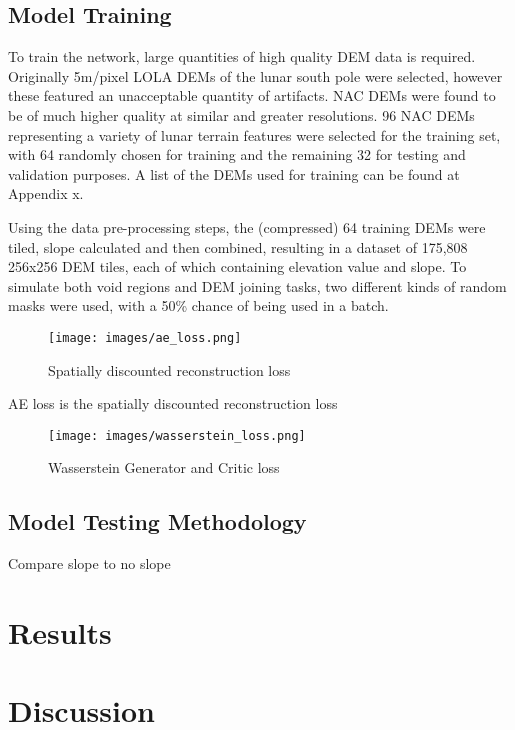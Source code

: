 \documentclass[twocolumn]{article}
\begin{document}
\subsection{Model Training}
\label{sec:org244e067}

To train the network, large quantities of high quality DEM data is required.
Originally 5m/pixel LOLA DEMs of the lunar south pole were selected, however these featured an unacceptable quantity of artifacts.
NAC DEMs were found to be of much higher quality at similar and greater resolutions.
96 NAC DEMs\autocite{LROCRDRProduct} representing a variety of lunar terrain features were selected for the training set, with 64 randomly chosen for training and the remaining 32 for testing and validation purposes.
A list of the DEMs used for training can be found at Appendix x.

Using the data pre-processing steps, the (compressed) 64 training DEMs were tiled, slope calculated and then combined, resulting in a dataset of 175,808 256x256 DEM tiles, each of which containing elevation value and slope.
To simulate both void regions and DEM joining tasks, two different kinds of random masks were used, with a 50\% chance of being used in a batch.


\begin{figure}[htbp]
\centering
\texttt{[image: images/ae\_loss.png]}
\caption{\label{fig:ae_loss}Spatially discounted reconstruction loss}
\end{figure}

AE loss is the spatially discounted reconstruction loss\autocite{zhangVoidFillingBased2020}

\begin{figure}[htbp]
\centering
\texttt{[image: images/wasserstein\_loss.png]}
\caption{\label{fig:wasserstein_loss}Wasserstein Generator and Critic loss}
\end{figure}

\subsection{Model Testing Methodology}
\label{sec:org02f4a07}


Compare slope to no slope


\section{Results}
\label{sec:org7d083cf}

\section{Discussion}
\label{sec:orgd723448}
\end{document}
